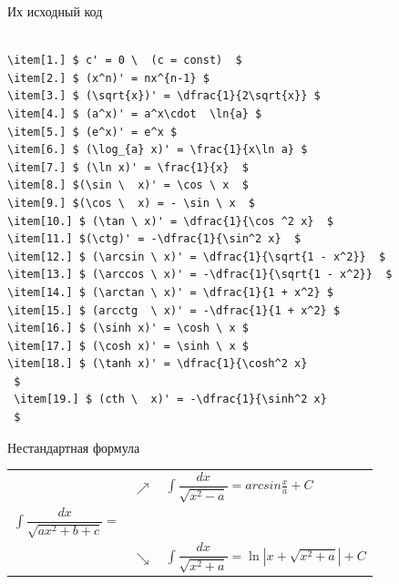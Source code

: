 \documentclass{beamer}[aspectratio=169]
\begin{document}
\begin{frame}[fragile]{Их исходный код}
\transwipe
\begin{adjustbox}{width=15cm,height=3.5cm,keepaspectratio}
 \begin{lstlisting}[language=Tex]

\item[1.] $ c' = 0 \  (c = const)  $
\item[2.] $ (x^n)' = nx^{n-1} $
\item[3.] $ (\sqrt{x})' = \dfrac{1}{2\sqrt{x}} $
\item[4.] $ (a^x)' = a^x\cdot  \ln{a} $
\item[5.] $ (e^x)' = e^x $
\item[6.] $ (\log_{a} x)' = \frac{1}{x\ln a} $
\item[7.] $ (\ln x)' = \frac{1}{x}  $ 
\item[8.] $(\sin \  x)' = \cos \ x  $ 
\item[9.] $(\cos \  x) = - \sin \ x  $ 
\item[10.] $ (\tan \ x)' = \dfrac{1}{\cos ^2 x}  $
\item[11.] $(\ctg)' = -\dfrac{1}{\sin^2 x}  $
\item[12.] $ (\arcsin \ x)' = \dfrac{1}{\sqrt{1 - x^2}}  $ 
\item[13.] $ (\arccos \ x)' = -\dfrac{1}{\sqrt{1 - x^2}}  $ 
\item[14.] $ (\arctan \ x)' = \dfrac{1}{1 + x^2} $
\item[15.] $ (arcctg  \ x)' = -\dfrac{1}{1 + x^2} $
\item[16.] $ (\sinh x)' = \cosh \ x $
\item[17.] $ (\cosh x)' = \sinh \ x $
\item[18.] $ (\tanh x)' = \dfrac{1}{\cosh^2 x}
 $
 \item[19.] $ (cth \  x)' = -\dfrac{1}{\sinh^2 x}
 $
\end{lstlisting}
\end{adjustbox}
\end{frame}

\begin{frame}[label=Frame]{Нестандартная формула}
\transwipe
\begin{tabular}{l l l} 
   &  {$\nearrow $} & {$ \int \dfrac{dx}{\sqrt{x^2-a}}=arcsin\frac{x}{a} + C $} \\
  $ \int \dfrac{dx}{\sqrt{ax^2 + b + c}} = $ &  &  \\ 
       & $\searrow $ & $ \int \dfrac{dx}{\sqrt{x^2+a}} = \ln|x+\sqrt{x^2+a}| + C  $\\ 
  \end{tabular}
\begin{center}
\hyperlink{Back}{}
\end{center}
\end{frame}
\end{document}
